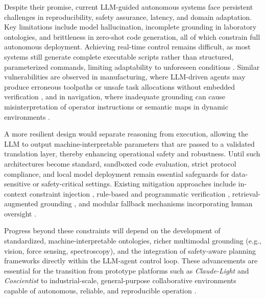Despite their promise, current LLM-guided autonomous systems face persistent challenges in reproducibility, safety assurance, latency, and domain adaptation. Key limitations include model hallucination, incomplete grounding in laboratory ontologies, and brittleness in zero-shot code generation, all of which constrain full autonomous deployment. Achieving real-time control remains difficult, as most systems still generate complete executable scripts rather than structured, parameterized commands, limiting adaptability to unforeseen conditions \cite{xie2025toward}. Similar vulnerabilities are observed in manufacturing, where LLM-driven agents may produce erroneous toolpaths or unsafe task allocations without embedded verification \cite{fan2025embodied,gkournelos2024llm}, and in navigation, where inadequate grounding can cause misinterpretation of operator instructions or semantic maps in dynamic environments \cite{wang2024llm}. 

A more resilient design would separate reasoning from execution, allowing the LLM to output machine-interpretable parameters that are passed to a validated translation layer, thereby enhancing operational safety and robustness. Until such architectures become standard, sandboxed code evaluation, strict protocol compliance, and local model deployment remain essential safeguards for data-sensitive or safety-critical settings. Existing mitigation approaches include in-context constraint injection \cite{yoshikawa2023large}, rule-based and programmatic verification \cite{kitchin2025evolving,yoshikawa2023large}, retrieval-augmented grounding \cite{boiko2023autonomous}, and modular fallback mechanisms incorporating human oversight \cite{tom2024self}. 

Progress beyond these constraints will depend on the development of standardized, machine-interpretable ontologies, richer multimodal grounding (e.g., vision, force sensing, spectroscopy), and the integration of safety-aware planning frameworks directly within the LLM-agent control loop. These advancements are essential for the transition from prototype platforms such as \emph{Claude-Light} and \emph{Coscientist} to industrial-scale, general-purpose collaborative environments capable of autonomous, reliable, and reproducible operation \cite{yoshikawa2023large}.

